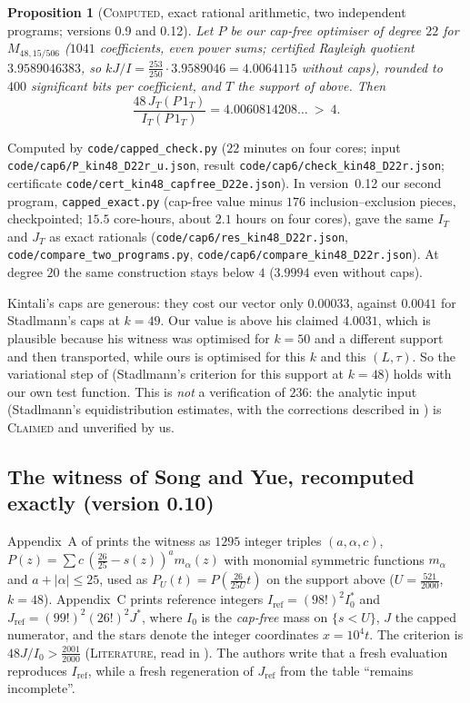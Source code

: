 \documentclass[11pt]{amsart}
\newtheorem{proposition}[theorem]{Proposition}
\theoremstyle{definition}
\theoremstyle{remark}
\newcommand{\lbl}[1]{\textup{\textsc{#1}}}
\begin{document}
\begin{proposition}[\lbl{Computed}, exact rational arithmetic, two independent programs; versions 0.9 and 0.12]\label{prop:kin-capped}
Let $P$ be our cap-free optimiser of degree $22$ for $M_{48,15/506}$ ($1041$
coefficients, even power sums; certified Rayleigh quotient $3.9589046383$, so
$kJ/I=\frac{253}{250}\cdot3.9589046=4.0064115$ without caps), rounded to
$400$ significant bits per coefficient, and $T$ the support of \cite{Kin26}
above. Then
\[
\frac{48\,J_T(P\,1_T)}{I_T(P\,1_T)}=4.0060814208\ldots\ >\ 4 .
\]
\end{proposition}
\begin{sloppypar}
Computed by \texttt{code/capped\_check.py} ($22$ minutes on four cores; input
\texttt{code/cap6/P\_kin48\_D22r\_u.json}, result
\texttt{code/cap6/check\_kin48\_D22r.json}; certificate
\texttt{code/cert\_kin48\_capfree\_D22e.json}). In version~0.12 our second program, \texttt{capped\_exact.py}
(cap-free value minus $176$ inclusion--exclusion pieces, checkpointed;
$15.5$ core-hours, about $2.1$ hours on four cores), gave the same $I_T$ and
$J_T$ as exact rationals (\texttt{code/cap6/res\_kin48\_D22r.json},
\texttt{code/compare\_two\_programs.py},
\texttt{code/cap6/compare\_kin48\_D22r.json}).
At degree $20$ the
same construction stays below $4$ ($3.9994$ even without caps).
\end{sloppypar}
Kintali's caps are generous: they cost our vector only $0.00033$, against
$0.0041$ for Stadlmann's caps at $k=49$. Our value is above his claimed
$4.0031$, which is plausible because his witness was optimised for $k=50$
and a different support and then transported, while ours is optimised for
this $k$ and this $(L,\tau)$. So the variational step of \cite{Kin26}
(Stadlmann's criterion for this support at $k=48$) holds with our own test
function. This is \emph{not} a verification of $236$: the analytic input
(Stadlmann's equidistribution estimates, with the corrections described in
\cite{Kin26}) is \lbl{Claimed} and unverified by us.

\subsection*{The witness of Song and Yue, recomputed exactly (version 0.10)}
Appendix~A of \cite{SY26} prints the witness as $1295$ integer triples
$(a,\alpha,c)$, $P(z)=\sum c\,(\frac{26}{25}-s(z))^{a}m_\alpha(z)$ with
monomial symmetric functions $m_\alpha$ and $a+|\alpha|\le25$, used as
$P_U(t)=P(\frac{26}{25U}t)$ on the support above ($U=\frac{521}{2000}$, $k=48$).
Appendix~C prints reference integers $I_{\mathrm{ref}}=(98!)^2I_0^{*}$ and
$J_{\mathrm{ref}}=(99!)^2(26!)^2J^{*}$, where $I_0$ is the \emph{cap-free}
mass on $\{s<U\}$, $J$ the capped numerator, and the stars denote the integer
coordinates $x=10^4t$. The criterion is $48J/I_0>\frac{2001}{2000}$
(\lbl{Literature}, read in \cite[\S4.12, App.~C]{SY26}). The authors write
that a fresh evaluation reproduces $I_{\mathrm{ref}}$, while a fresh
regeneration of $J_{\mathrm{ref}}$ from the table ``remains incomplete''.
\end{document}
